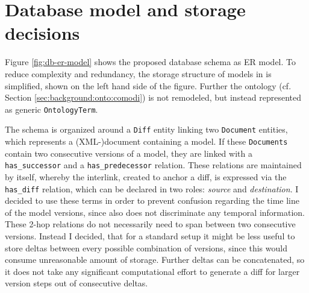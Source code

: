 \section{Database model and storage decisions}
\label{sec:concept:dbmodel}

Figure \ref{fig:db-er-model} shows the proposed database schema as ER model. To reduce complexity and redundancy, the storage structure of models in \masymos is simplified, shown on the left hand side of the figure. Further the \comodi ontology (cf. Section \ref{sec:background:onto:comodi}) is not remodeled, but instead represented as generic \texttt{OntologyTerm}.


The schema is organized around a \texttt{Diff} entity linking two \texttt{Document} entities, which represents a (XML-)document containing a model. If these \texttt{Documents} contain two consecutive versions of a model, they are linked with a \texttt{has\_successor} and a \texttt{has\_predecessor} relation. These relations are maintained by \masymos itself, whereby the interlink, created to anchor a diff, is expressed via the \texttt{has\_diff} relation, which can be declared in two roles: \emph{source} and \emph{destination}. I decided to use these terms in order to prevent confusion regarding the time line of the model versions, since \bives also does not discriminate any temporal information.
These 2-hop relations do not necessarily need to span between two consecutive versions.
Instead I decided, that for a standard setup it might be less useful to store deltas between every possible combination of versions, since this would consume unreasonable amount of storage.
Further deltas can be concatenated, so it does not take any significant computational effort to generate a diff for larger version steps out of consecutive deltas.

